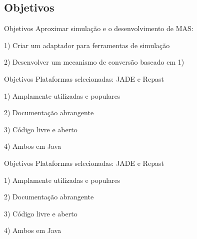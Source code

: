\subsection{Objetivos}
\begin{frame}{Objetivos}
Aproximar simulação e o desenvolvimento de MAS:

1) Criar um adaptador para ferramentas de simulação

2) Desenvolver um mecanismo de conversão baseado em 1)
\end{frame}

\begin{frame}{Objetivos}
Plataformas selecionadas: JADE e Repast

1) Amplamente utilizadas e populares

2) Documentação abrangente

3) Código livre e aberto

4) Ambos em Java

\end{frame}

\begin{frame}{Objetivos}
Plataformas selecionadas: JADE e Repast

1) Amplamente utilizadas e populares

2) Documentação abrangente

3) Código livre e aberto

4) Ambos em Java

\end{frame}